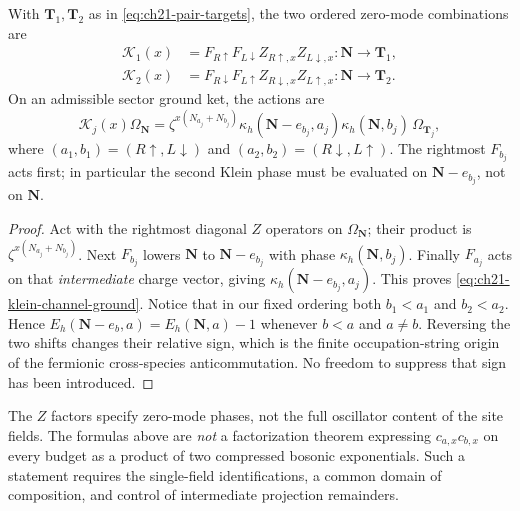 \begin{proposition}
\label{prop:ch21-two-klein-products}
With \(\mathbf T_1,\mathbf T_2\) as in
\eqref{eq:ch21-pair-targets}, the two ordered zero-mode combinations are
\begin{align}
 \mathcal K_1(x)&=
 F_{R\uparrow}F_{L\downarrow}
 Z_{R\uparrow,x}Z_{L\downarrow,x}:
  \mathbf N\longrightarrow\mathbf T_1,
 \label{eq:ch21-klein-one}\\
 \mathcal K_2(x)&=
 F_{R\downarrow}F_{L\uparrow}
 Z_{R\downarrow,x}Z_{L\uparrow,x}:
  \mathbf N\longrightarrow\mathbf T_2.
 \label{eq:ch21-klein-two}
\end{align}
On an admissible sector ground ket, the actions are
\begin{equation}
 \mathcal K_j(x)\Omega_{\mathbf N}
  =\zeta^{x(N_{a_j}+N_{b_j})}
    \kappa_h(\mathbf N-e_{b_j},a_j)
    \kappa_h(\mathbf N,b_j)\,\Omega_{\mathbf T_j},
 \label{eq:ch21-klein-channel-ground}
\end{equation}
where \((a_1,b_1)=(R\uparrow,L\downarrow)\) and
\((a_2,b_2)=(R\downarrow,L\uparrow)\).
The rightmost \(F_{b_j}\) acts first; in particular the second
Klein phase must be evaluated on \(\mathbf N-e_{b_j}\), not on
\(\mathbf N\).
\end{proposition}

\begin{proof}
Act with the rightmost diagonal \(Z\) operators on
\(\Omega_{\mathbf N}\); their product is
\(\zeta^{x(N_{a_j}+N_{b_j})}\).  Next \(F_{b_j}\) lowers
\(\mathbf N\) to \(\mathbf N-e_{b_j}\) with phase
\(\kappa_h(\mathbf N,b_j)\).  Finally \(F_{a_j}\) acts on that
\emph{intermediate} charge vector, giving
\(\kappa_h(\mathbf N-e_{b_j},a_j)\).
This proves \eqref{eq:ch21-klein-channel-ground}.
Notice that in our fixed ordering both \(b_1<a_1\) and
\(b_2<a_2\).  Hence
\(E_h(\mathbf N-e_b,a)=E_h(\mathbf N,a)-1\) whenever
\(b<a\) and \(a\ne b\).  Reversing the two shifts changes their
relative sign, which is the finite occupation-string origin of the
fermionic cross-species anticommutation.  No freedom to suppress that
sign has been introduced.
\end{proof}

The \(Z\) factors specify zero-mode phases, not the full oscillator
content of the site fields.  The formulas above are \emph{not} a
factorization theorem expressing \(c_{a,x}c_{b,x}\) on every budget
as a product of two compressed bosonic exponentials.  Such a statement
requires the single-field identifications, a common domain of composition,
and control of intermediate projection remainders.

